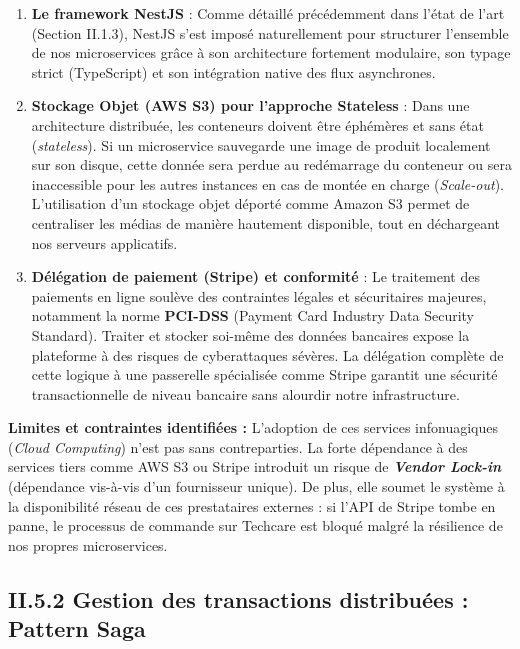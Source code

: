 \begin{enumerate}[label=\alph*)]
    \item \textbf{Le framework NestJS} : Comme détaillé précédemment dans l'état de l'art (Section II.1.3), NestJS s'est imposé naturellement pour structurer l'ensemble de nos microservices grâce à son architecture fortement modulaire, son typage strict (TypeScript) et son intégration native des flux asynchrones.

    \item \textbf{Stockage Objet (AWS S3) pour l'approche Stateless} : Dans une architecture distribuée, les conteneurs doivent être éphémères et sans état (\textit{stateless}). Si un microservice sauvegarde une image de produit localement sur son disque, cette donnée sera perdue au redémarrage du conteneur ou sera inaccessible pour les autres instances en cas de montée en charge (\textit{Scale-out}). L'utilisation d'un stockage objet déporté comme Amazon S3 permet de centraliser les médias de manière hautement disponible, tout en déchargeant nos serveurs applicatifs.

    \item \textbf{Délégation de paiement (Stripe) et conformité} : Le traitement des paiements en ligne soulève des contraintes légales et sécuritaires majeures, notamment la norme \textbf{PCI-DSS} (Payment Card Industry Data Security Standard). Traiter et stocker soi-même des données bancaires expose la plateforme à des risques de cyberattaques sévères. La délégation complète de cette logique à une passerelle spécialisée comme Stripe garantit une sécurité transactionnelle de niveau bancaire sans alourdir notre infrastructure.
\end{enumerate}

\textbf{Limites et contraintes identifiées :}
L'adoption de ces services infonuagiques (\textit{Cloud Computing}) n'est pas sans contreparties. La forte dépendance à des services tiers comme AWS S3 ou Stripe introduit un risque de \textbf{\textit{Vendor Lock-in}} (dépendance vis-à-vis d'un fournisseur unique). De plus, elle soumet le système à la disponibilité réseau de ces prestataires externes : si l'API de Stripe tombe en panne, le processus de commande sur Techcare est bloqué malgré la résilience de nos propres microservices.

\subsection{II.5.2 Gestion des transactions distribuées : Pattern Saga}

